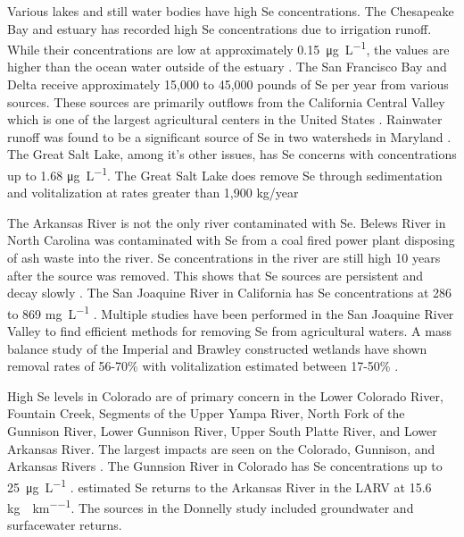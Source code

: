 \begin{linenumbers}[1]
Various lakes and still water bodies have high Se concentrations.  The Chesapeake Bay and estuary has recorded high Se concentrations due to irrigation runoff.  While their concentrations are low at approximately \SI{0.15}{\micro\gram\per\liter}, the values are higher than the ocean water outside of the estuary \citep{Takayanagi1984}.  The San Francisco Bay and Delta receive approximately 15,000 to 45,000 pounds of Se per year from various sources.  These sources are primarily outflows from the California Central Valley which is one of the largest agricultural centers in the United States \citep{2000luoma}.  Rainwater runoff was found to be a significant source of Se in two watersheds in Maryland \citep{Lawson2001}.  The Great Salt Lake, among it's other issues, has Se concerns with concentrations up to 1.68 \si{\micro\gram\per\liter}.  The Great Salt Lake does remove Se through sedimentation and volitalization at rates greater than 1,900 kg/year \citep{2008naftz,oliver2009}

The Arkansas River is not the only river contaminated with Se.  Belews River in North Carolina was contaminated with Se from a coal fired power plant disposing of ash waste into the river.  Se concentrations in the river are still high 10 years after the source was removed.  This shows that Se sources are persistent and decay slowly \citep{Lemly2002}.   The San Joaquine River in California has Se concentrations at 286 to 869 \si{\milli\gram\per\liter} \citep{Clifton1989}.  Multiple studies have been performed in the San Joaquine River Valley to find efficient methods for removing Se from agricultural waters.  A mass balance study of the Imperial and Brawley constructed wetlands have shown removal rates of 56-70\% with volitalization estimated between 17-50\% \citep{Gersberg2006}.

High Se levels in Colorado are of primary concern in the Lower Colorado River, Fountain Creek, Segments of the Upper Yampa River, North Fork of the Gunnison River, Lower Gunnison River, Upper South Platte River, and Lower Arkansas River.  The largest impacts are seen on the Colorado, Gunnison, and Arkansas Rivers \citep{5CCR1002}.  The Gunnsion River in Colorado has Se concentrations up to \SI{25}{\micro\gram\per\liter} \citep{2008USBR}.  \citet{2005Donnelly} estimated Se returns to the Arkansas River in the LARV at 15.6 \si{\kilo\gram\per\year\per\kilo\meter}.  The sources in the Donnelly study included groundwater and surfacewater returns.


\end{linenumbers}
